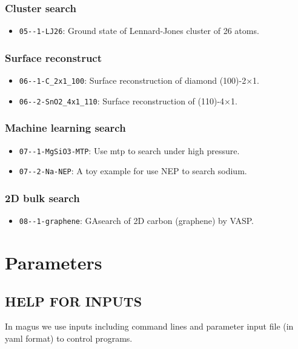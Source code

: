 \documentclass[12pt,oneside]{book}
\begin{document}
\subsection{Cluster search}\label{Cluster search}
\begin{itemize}
\item \verb|05--1-LJ26|: Ground state of Lennard-Jones cluster of 26 atoms.
\end{itemize}

\subsection{Surface reconstruct}\label{Surface reconstruct}
\begin{itemize}
\item \verb|06--1-C_2x1_100|: Surface reconstruction of diamond (100)-2×1.
\item \verb|06--2-SnO2_4x1_110|: Surface reconstruction of  (110)-4×1.
\end{itemize}

\subsection{Machine learning search}\label{Machine learning search}
\begin{itemize}
\item \verb|07--1-MgSiO3-MTP|: Use mtp to search  under high pressure.
\item \verb|07--2-Na-NEP|: A toy example for use NEP to search sodium.
\end{itemize}

\subsection{2D bulk search}\label{2D bulk search}
\begin{itemize}
\item \verb|08--1-graphene|: GAsearch of 2D carbon (graphene) by VASP.
\end{itemize}

\newpage
\chapter{Parameters}
\section{HELP FOR INPUTS}
In magus we use inputs including command lines and parameter input file (in yaml format) to control programs. 
\end{document}
